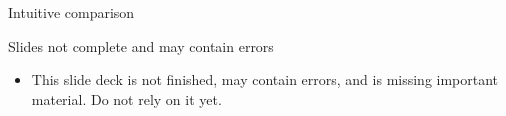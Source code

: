 \documentclass[aspectratio=169, lualatex, handout]{beamer}
\begin{document}
\begin{frame}{Intuitive comparison}
\end{frame}

\begin{frame}{Slides not complete and may contain errors}
	\begin{itemize}
		\item This slide deck is not finished, may contain errors, and is missing important material. Do not rely on it yet.
	\end{itemize}
\end{frame}

\begin{frame}[plain]
	\titlepage
\end{frame}
\end{document}
